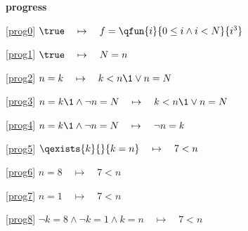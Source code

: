 \textbf{progress}
\begin{block}
\item[ \eqref{prog0} ]$\true \quad \mapsto\quad f = \qfun{i}{0 \le i \land i < N}{i^3} $ %
\item[ \eqref{prog1} ]$\true \quad \mapsto\quad N = n $ %
\item[ \eqref{prog2} ]$n = k \quad \mapsto\quad k < n \1\lor n = N $ %
\item[ \eqref{prog3} ]$n = k \1\land \neg n = N  \quad \mapsto\quad k < n \1\lor n = N $ %
\item[ \eqref{prog4} ]$n = k \1\land \neg n = N  \quad \mapsto\quad \neg n = k $ %
\item[ \eqref{prog5} ]$\qexists{k}{}{k = n}  \quad \mapsto\quad 7 < n  $ %
\item[ \eqref{prog6} ]$n = 8  \quad \mapsto\quad 7 < n  $ %
\item[ \eqref{prog7} ]$n = 1  \quad \mapsto\quad 7 < n  $ %
\item[ \eqref{prog8} ]$\neg k = 8 \land \neg k = 1 \land k = n  \quad \mapsto\quad 7 < n  $ %
\end{block}
